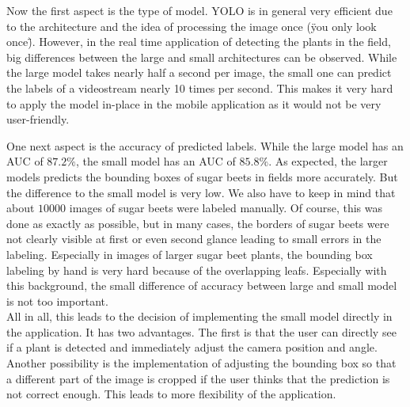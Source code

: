 Now the first aspect is the type of model. YOLO is in general very efficient due to the architecture and the idea of processing the image once (\"you only look once\"). However, in the real time application of detecting the plants in the field, big differences between the large and small architectures can be observed. While the large model takes nearly half a second per image, the small one can predict the labels of a videostream nearly 10 times per second. This makes it very hard to apply the model in-place in the mobile application as it would not be very user-friendly.

One next aspect is the accuracy of predicted labels. While the large model has an AUC of $ 87.2\% $, the small model has an AUC of $ 85.8\% $. As expected, the larger models predicts the bounding boxes of sugar beets in fields more accurately. But the difference to the small model is very low. We also have to keep in mind that about $ 10000 $ images of sugar beets were labeled manually. Of course, this was done as exactly as possible, but in many cases, the borders of sugar beets were not clearly visible at first or even second glance leading to small errors in the labeling. Especially in images of larger sugar beet plants, the bounding box labeling by hand is very hard because of the overlapping leafs. Especially with this background, the small difference of accuracy between large and small model is not too important.\\

All in all, this leads to the decision of implementing the small model directly in the application. It has two advantages. The first is that the user can directly see if a plant is detected and immediately adjust the camera position and angle. Another possibility is the implementation of adjusting the bounding box so that a different part of the image is cropped if the user thinks that the prediction is not correct enough. This leads to more flexibility of the application. 

